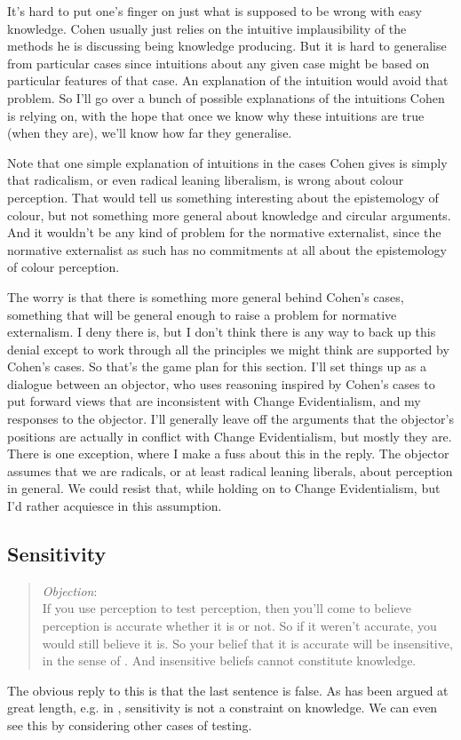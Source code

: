 It's hard to put one's finger on just what is supposed to be wrong with easy knowledge. Cohen usually just relies on the intuitive implausibility of the methods he is discussing being knowledge producing. But it is hard to generalise from particular cases since intuitions about any given case might be based on particular features of that case. An explanation of the intuition would avoid that problem. So I'll go over a bunch of possible explanations of the intuitions Cohen is relying on, with the hope that once we know why these intuitions are true (when they are), we'll know how far they generalise.

Note that one simple explanation of intuitions in the cases Cohen gives is simply that radicalism, or even radical leaning liberalism, is wrong about colour perception. That would tell us something interesting about the epistemology of colour, but not something more general about knowledge and circular arguments. And it wouldn't be any kind of problem for the normative externalist, since the normative externalist as such has no commitments at all about the epistemology of colour perception.

The worry is that there is something more general behind Cohen's cases, something that will be general enough to raise a problem for normative externalism. I deny there is, but I don't think there is any way to back up this denial except to work through all the principles we might think are supported by Cohen's cases. So that's the game plan for this section. I'll set things up as a dialogue between an objector, who uses reasoning inspired by Cohen's cases to put forward views that are inconsistent with Change Evidentialism, and my responses to the objector. I'll generally leave off the arguments that the objector's positions are actually in conflict with Change Evidentialism, but mostly they are. There is one exception, where I make a fuss about this in the reply. The objector assumes that we are radicals, or at least radical leaning liberals, about perception in general. We could resist that, while holding on to Change Evidentialism, but I'd rather acquiesce in this assumption.

\subsection{Sensitivity}
\label{sensitivity}

\begin{quote}
\emph{Objection}:\\
If you use perception to test perception, then you'll come to believe perception is accurate whether it is or not. So if it weren't accurate, you would still believe it is. So your belief that it is accurate will be insensitive, in the sense of \citet{Nozick1981}. And insensitive beliefs cannot constitute knowledge.
\end{quote}
The obvious reply to this is that the last sentence is false. As has been argued at great length, e.g. in \citet[ch. 7]{Williamson2000}, sensitivity is not a constraint on knowledge. We can even see this by considering other cases of testing.

